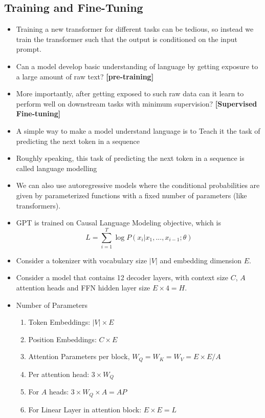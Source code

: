 \documentclass[a4paper]{article}
\begin{document}
\subsection{Training and Fine-Tuning}
\begin{itemize}
    \item Training a new transformer for different tasks can be tedious, so instead we train the transformer such that the output is conditioned on the input prompt.
    \item Can a model develop basic understanding of language by getting exposure to a large amount of raw text? \textbf{[pre-training]}
    \item More importantly, after getting exposed to such raw data can it learn to perform well on downstream tasks with minimum supervision? \textbf{[Supervised Fine-tuning]}
    \item A simple way to make a model understand language is to Teach it the task of predicting the next token in a sequence
    \item Roughly speaking, this task of predicting the next token in a sequence is called language modelling
    \item We can also use autoregressive models where the conditional probabilities are given by parameterized functions with a fixed number of parameters (like transformers).
    \item GPT is trained on Causal Language Modeling objective, which is
    \begin{equation*}
        L=\sum_{i=1}^T\log{P(x_i|x_1,...,x_{i-1};\theta)}
    \end{equation*}
    \item Consider a tokenizer with vocabulary size $|V|$ and embedding dimension $E$.
    \item Consider a model that contains 12 decoder layers, with context size $C$, $A$ attention heads and FFN hidden layer size $E\times 4=H$.
    \item Number of Parameters
    \begin{enumerate}
        \item Token Embeddings: $|V|\times E$
        \item Position Embeddings: $C\times E$
        \item Attention Parameters per block, $W_Q=W_K=W_V=E\times E/A$
        \item Per attention head: $3\times W_Q$
        \item For $A$ heads: $3\times W_Q\times A=AP$
        \item For Linear Layer in attention block: $E\times E=L$

\end{enumerate}
\end{itemize}
\end{document}
